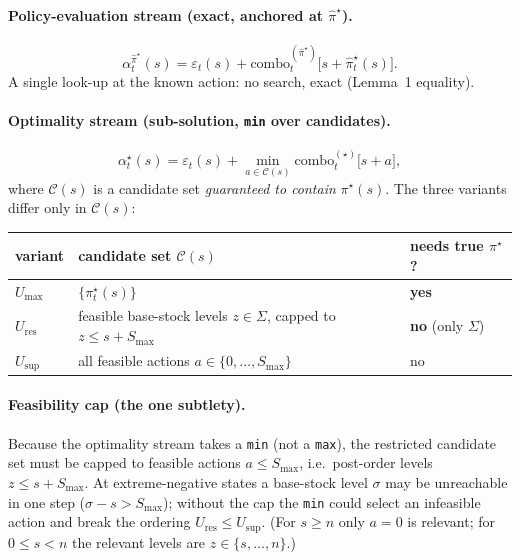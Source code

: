 \documentclass[11pt]{article}
\newcommand{\Smax}{S_{\max}}
\newcommand{\pihat}{\hat\pi}
\begin{document}
\paragraph{Policy-evaluation stream (exact, anchored at $\pihat^\star$).}
\begin{equation}
\alpha^{\pihat^\star}_t(s)=\varepsilon_t(s)+\mathrm{combo}^{(\pihat^\star)}_t\!\bigl[s+\pihat^\star_t(s)\bigr].
\label{eq:ph}
\end{equation}
A single look-up at the known action: no search, exact (Lemma~1 equality).

\paragraph{Optimality stream (sub-solution, \texttt{min} over candidates).}
\begin{equation}
\alpha^{\star}_t(s)=\varepsilon_t(s)+\min_{a\in\mathcal C(s)}
\mathrm{combo}^{(\star)}_t\!\bigl[s+a\bigr],
\label{eq:star}
\end{equation}
where $\mathcal C(s)$ is a candidate set \emph{guaranteed to contain}
$\pi^\star(s)$. The three variants differ only in $\mathcal C(s)$:

\begin{center}
\begin{tabular}{lll}
\toprule
variant & candidate set $\mathcal C(s)$ & needs true $\pi^\star$?\\
\midrule
$U_{\max}$ & $\{\pi^\star_t(s)\}$ & \textbf{yes}\\
$U_{\mathrm{res}}$ & feasible base-stock levels $z\in\Sigma$, capped to $z\le s+\Smax$ & \textbf{no} (only $\Sigma$)\\
$U_{\sup}$ & all feasible actions $a\in\{0,\dots,\Smax\}$ & no\\
\bottomrule
\end{tabular}
\end{center}

\paragraph{Feasibility cap (the one subtlety).}
Because the optimality stream takes a \texttt{min} (not a \texttt{max}), the
restricted candidate set must be capped to feasible actions $a\le\Smax$, i.e.\
post-order levels $z\le s+\Smax$. At extreme-negative states a base-stock level
$\sigma$ may be unreachable in one step ($\sigma-s>\Smax$); without the cap the
\texttt{min} could select an infeasible action and break the ordering
$U_{\mathrm{res}}\le U_{\sup}$. (For $s\ge n$ only $a=0$ is relevant; for
$0\le s<n$ the relevant levels are $z\in\{s,\dots,n\}$.)
\end{document}
